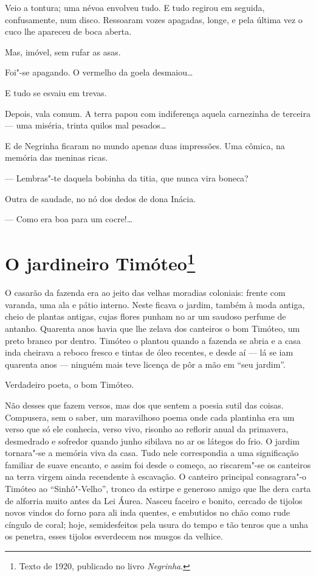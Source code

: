 Veio a tontura; uma névoa envolveu tudo. E tudo regirou em seguida,
confusamente, num disco. Ressoaram vozes apagadas, longe, e pela última
vez o cuco lhe apareceu de boca aberta.

Mas, imóvel, sem rufar as asas.

Foi"-se apagando. O vermelho da goela desmaiou\ldots{}

E tudo se esvaiu em trevas.

Depois, vala comum. A terra papou com indiferença aquela carnezinha de
terceira --- uma miséria, trinta quilos mal pesados\ldots{}

E de Negrinha ficaram no mundo apenas duas impressões. Uma cômica, na
memória das meninas ricas.

--- Lembras"-te daquela bobinha da titia, que nunca vira boneca?

Outra de saudade, no nó dos dedos de dona Inácia.

--- Como era boa para um cocre!\ldots{}

\chapter{O jardineiro Timóteo\footnote[*]{Texto de 1920, publicado no livro \emph{Negrinha}.}}


O casarão da fazenda era ao jeito das velhas moradias coloniais: frente
com varanda, uma ala e pátio interno. Neste ficava o jardim, também à
moda antiga, cheio de plantas antigas, cujas flores punham no ar um
saudoso perfume de antanho. Quarenta anos havia que lhe zelava dos
canteiros o bom Timóteo, um preto branco por dentro. Timóteo o plantou
quando a fazenda se abria e a casa inda cheirava a reboco fresco e
tintas de óleo recentes, e desde aí --- lá se iam quarenta anos ---
ninguém mais teve licença de pôr a mão em ``seu jardim''.

Verdadeiro poeta, o bom Timóteo.

Não desses que fazem versos, mas dos que sentem a poesia sutil das
coisas. Compusera, sem o saber, um maravilhoso poema onde cada plantinha
era um verso que só ele conhecia, verso vivo, risonho ao reflorir anual
da primavera, desmedrado e sofredor quando junho sibilava no ar os
látegos do frio. O jardim tornara"-se a memória viva da casa. Tudo nele
correspondia a uma significação familiar de suave encanto, e assim foi
desde o começo, ao riscarem"-se os canteiros na terra virgem ainda
recendente à escavação. O canteiro principal consagrara"-o Timóteo ao
``Sinhô"-Velho'', tronco da estirpe e generoso amigo que lhe dera carta
de alforria muito antes da Lei Áurea. Nasceu faceiro e bonito, cercado
de tijolos novos vindos do forno para ali inda quentes, e embutidos no
chão como rude cíngulo de coral; hoje, semidesfeitos pela usura do tempo
e tão tenros que a unha os penetra, esses tijolos esverdecem nos musgos
da velhice.

